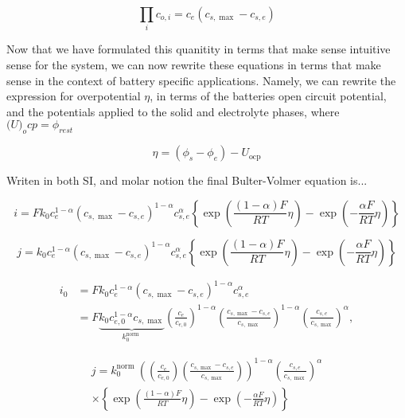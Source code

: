 \documentclass[lettersize,journal]{IEEEtran}
\begin{document}
\begin{equation}
\prod_{i} c_{o, i}=c_{e}\left(c_{s, \max }-c_{s, e}\right)
\end{equation}

\noindent Now that we have formulated this quanitity in terms that make sense intuitive sense for the system, we can now rewrite these equations in terms that make sense in the context of battery specific applications. Namely, we can rewrite the expression for overpotential $\eta$, in terms of the batteries open circuit potential, and the potentials applied to the solid and electrolyte phases, where $\mathscr(U)_ocp = \phi_{rest}$

\begin{equation}
\eta=\left(\phi_{s}-\phi_{e}\right)-U_{\mathrm{ocp}}
\end{equation}

Writen in both SI, and molar notion the final Bulter-Volmer equation is...


\begin{equation}
i=F k_{0} c_{e}^{1-\alpha}\left(c_{s, \max }-c_{s, e}\right)^{1-\alpha} c_{s, e}^{\alpha}\left\{\exp \left(\frac{(1-\alpha) F}{R T} \eta\right)-\exp \left(-\frac{\alpha F}{R T} \eta\right)\right\}
\end{equation}

\begin{equation}
j=k_{0} c_{e}^{1-\alpha}\left(c_{s, \max }-c_{s, e}\right)^{1-\alpha} c_{s, e}^{\alpha}\left\{\exp \left(\frac{(1-\alpha) F}{R T} \eta\right)-\exp \left(-\frac{\alpha F}{R T} \eta\right)\right\}
\end{equation}


\begin{equation}
\begin{aligned}
i_{0} &=F k_{0} c_{e}^{1-\alpha}\left(c_{s, \max }-c_{s, e}\right)^{1-\alpha} c_{s, e}^{\alpha} \\
&=F \underbrace{k_{0} c_{e, 0}^{1-\alpha} c_{s, \max }}_{k_{0}^{\text {norm }}}\left(\frac{c_{e}}{c_{e, 0}}\right)^{1-\alpha}\left(\frac{c_{s, \max }-c_{s, e}}{c_{s, \max }}\right)^{1-\alpha}\left(\frac{c_{s, e}}{c_{s, \max }}\right)^{\alpha},
\end{aligned}
\end{equation}

\begin{equation}
\begin{array}{c}
j=k_{0}^{\text {norm }}\left(\left(\frac{c_{e}}{c_{e, 0}}\right)\left(\frac{c_{s, \max }-c_{s, e}}{c_{s, \max }}\right)\right)^{1-\alpha}\left(\frac{c_{s, e}}{c_{s, \max }}\right)^{\alpha} \\
\times\left\{\exp \left(\frac{(1-\alpha) F}{R T} \eta\right)-\exp \left(-\frac{\alpha F}{R T} \eta\right)\right\}
\end{array}
\end{equation}
\end{document}
